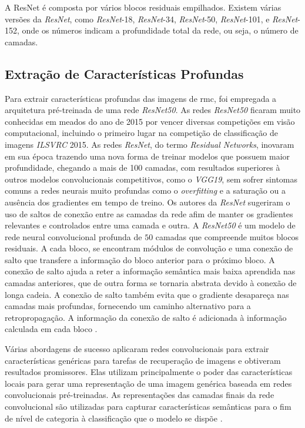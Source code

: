 A ResNet é composta por vários blocos residuais empilhados.
Existem várias versões da \textit{ResNet}, como \textit{ResNet}-18, \textit{ResNet}-34, \textit{ResNet}-50, \textit{ResNet}-101, e \textit{ResNet}-152, onde os números indicam a profundidade total da rede, ou seja, o número de camadas.

\subsection{Extração de Características Profundas}
\label{subsec:extract_features}

Para extrair características profundas das imagens de \gls{rmc}, foi empregada a arquitetura pré-treinada de uma rede \textit{ResNet50}. As redes \textit{ResNet50} ficaram muito conhecidas em meados do ano de 2015 por vencer diversas competições em visão computacional, incluindo o primeiro lugar na competição de classificação de imagens \textit{ILSVRC} 2015. As redes \textit{ResNet}, do termo \textit{Residual Networks}, inovaram em sua época trazendo uma nova forma de treinar modelos que possuem maior profundidade, chegando a mais de 100 camadas, com resultados superiores à outros modelos convolucionais competitivos, como o \textit{VGG19}, sem sofrer sintomas comuns a redes neurais muito profundas como o \textit{overfitting} e a saturação ou a ausência dos gradientes em tempo de treino. Os autores da \textit{ResNet} sugeriram o uso de saltos de conexão entre as camadas da rede afim de manter os gradientes relevantes e controlados entre uma camada e outra.  A \textit{ResNet50} é um modelo de rede neural convolucional profunda de $50$ camadas que compreende muitos blocos residuais. A cada bloco, se encontram módulos de convolução e uma conexão de salto que transfere a informação do bloco anterior para o próximo bloco. A conexão de salto ajuda a reter a informação semântica mais baixa aprendida nas camadas anteriores, que de outra forma se tornaria abstrata devido à conexão de longa cadeia. A conexão de salto também evita que o gradiente desapareça nas camadas mais profundas, fornecendo um caminho alternativo para a retropropagação. A informação da conexão de salto é adicionada à informação calculada em cada bloco \cite{heDeepResidualLearning2015}.

Várias abordagens de sucesso aplicaram redes convolucionais para extrair características genéricas para tarefas de recuperação de imagens e obtiveram resultados promissores. Elas utilizam principalmente o poder das características locais para gerar uma representação de uma imagem genérica baseada em redes convolucionais pré-treinadas. As representações das camadas finais da rede convolucional são utilizadas para capturar características semânticas para o fim de nível de categoria à classificação que o modelo se dispõe \cite{alzubiContentbasedImageRetrieval2017b}.

